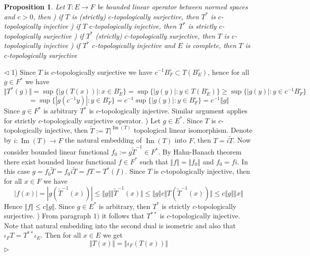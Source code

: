 \documentclass[12pt]{article}
\newtheorem{proposition}[theorem]{Proposition}
\newenvironment{proof}{\par $\triangleleft$}{$\triangleright$}
\begin{document}
\begin{proposition}\label{PrDualOps} 
Let $ T:E\to F$ be bounded linear operator between normed spaces and $c>0$, then
) if $ T$ is (strictly) $c$-topologically surjective, then $ T^*$ is $c$-topologically injective
) if $ T$ $c$-topologically injective, then $ T^*$ is strictly $c$-topologically surjective
) if $ T^*$ (strictly) $c$-topologically surjective, then $ T$ is $c$-topologically injective
) if $ T^*$ $c$-topologically injective and $E$ is complete, then $ T$ is $c$-topologically surjective
\end{proposition}
\begin{proof}
1) Since $T$ is $c$-topologically surjective we have $c^{-1}B_F^\circ\subset T(B_E^\circ)$, hence for all $g\in F^*$ we have
$$
\Vert  T^*(g)\Vert
=\sup\{|g( T(x))|:x\in B_E^\circ\}
=\sup\{|g(y)|: y\in T(B_E^\circ)\}
\geq\sup\{|g(y)|: y\in c^{-1}B_F^\circ\}
$$
$$
=\sup\{|g(c^{-1}y)|: y\in B_F^\circ\}
=c^{-1}\sup\{|g(y)|: y\in B_F^\circ\}
=c^{-1}\Vert g\Vert
$$
Since $g\in F^*$ is arbitrary $ T^*$ is $c$-topologically injective. Similar argument applies for strictly $c$-topologically surjective operator.
) Let $g\in E^*$. Since $ T$ is $c$-topologically injective, then $\tilde{ T}:= T|^{\operatorname{Im}( T)}$ topological linear isomorphism. Denote by $i:\operatorname{Im}( T)\to F$ the natural embedding of $\operatorname{Im}( T)$ into $F$, then $ T=i\tilde{ T}$. Now consider bounded linear functional $f_0:=g\tilde{ T}^{-1}\in F^*$. By Hahn-Banach theorem there exist bounded linear functional $f\in F^*$ such that $\Vert f\Vert=\Vert f_0\Vert$ and $f_0=fi$. In this case
$g=f_0\tilde{ T}=f_0 i\tilde{ T}=f T= T^*(f)$. Since $ T$ is $c$-topologically injective, then for all $x\in F$ we have
$$
|f(x)|=|g(\tilde{ T}^{-1}(x))|
\leq\Vert g\Vert\Vert \tilde{ T}^{-1}(x)\Vert
\leq\Vert g\Vert c\Vert  T(\tilde{ T}^{-1}(x))\Vert
\leq c\Vert g\Vert\Vert x\Vert
$$
Hence $\Vert f\Vert\leq c\Vert g\Vert$. Since $g\in E^*$ is arbitrary, then $ T^*$ is strictly $c$-topologically surjective.
) From paragraph $1)$ it follows that $ T^{**}$ is $c$-topologically injective. Note that natural embedding into the second dual is isometric and also that $\iota_F  T = T^{**}\iota_E$. 
Then for all $x\in E$ we get
$$
\Vert T(x)\Vert
=\Vert \iota_F( T(x))\Vert
$$
\end{proof}
\end{document}
